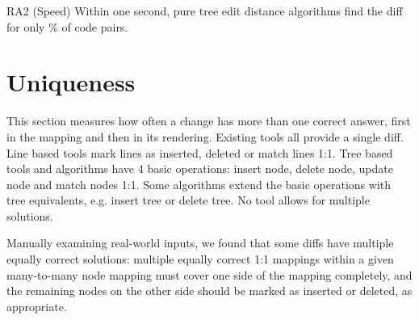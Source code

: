 \documentclass[sigconf]{acmart}
\begin{document}
\begin{resultbox}{RA2 (Speed)}
  Within one second, pure tree edit distance algorithms find the diff for only
  \RqOneCodePct{}\% of code pairs.
\end{resultbox}

\section{Uniqueness}
\label{sec:uniqueness}

This section measures how often a change has more than one correct answer, first in the mapping
and then in its rendering. Existing tools all provide a single diff. Line based tools mark lines as inserted, deleted or match lines
1:1. Tree based tools and algorithms have 4 basic operations: insert node, delete node, update node
and match nodes 1:1. Some algorithms extend the basic operations with tree equivalents, e.g. insert tree or
delete tree. No tool allows for multiple solutions.

Manually examining real-world inputs, we found that some diffs have multiple equally correct
solutions: multiple equally correct 1:1 mappings within a given many-to-many node mapping must
cover one side of the mapping completely, and the remaining nodes on the other side should be
marked as inserted or deleted, as appropriate.
\end{document}
